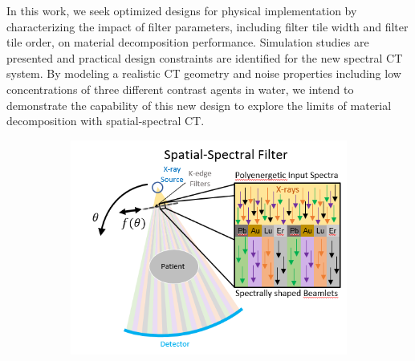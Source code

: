 \documentclass[12pt]{spieman}  %
\begin{document}
\begin{spacing}{1}
In this work, we seek optimized designs for physical implementation by characterizing the impact of filter parameters, including filter tile width and filter tile order, on material decomposition performance. Simulation studies are presented and practical design constraints are identified for the new spectral CT system. By modeling a realistic CT geometry and noise properties including low concentrations of three different contrast agents in water, we intend to demonstrate the capability of this new design to explore the limits of material decomposition with spatial-spectral CT.  



\begin{figure}
    \begin{subfigure}[t]{.45\textwidth}
      \centering
      \includegraphics[scale = 0.55]{figures/system.PNG}
      \caption{}
      \label{fig:system}
    \end{subfigure}%
    \begin{subfigure}[t]{.55\textwidth}
      \centering

\end{subfigure}
\end{figure}
\end{spacing}
\end{document}
